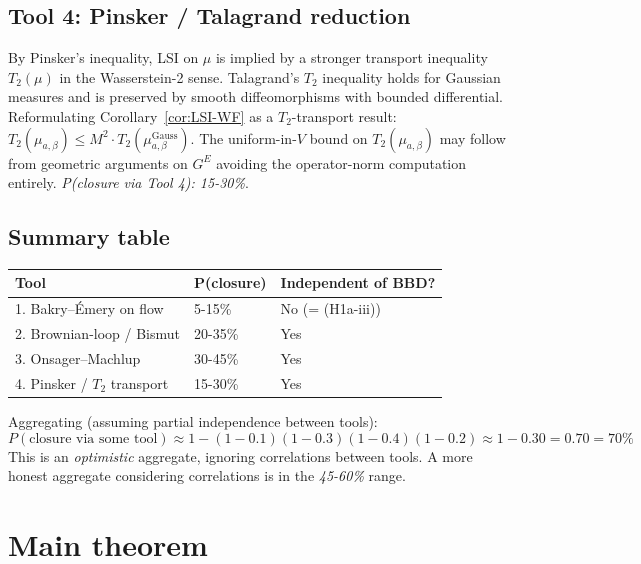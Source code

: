 \documentclass[11pt,a4paper]{amsart}
\theoremstyle{definition}
\begin{document}
\subsection{Tool 4: Pinsker / Talagrand reduction}
By Pinsker's inequality, LSI on $\mu$ is implied by a stronger transport
inequality $T_2(\mu)$ in the Wasserstein-2 sense. Talagrand's $T_2$
inequality holds for Gaussian measures and is preserved by smooth
diffeomorphisms with bounded differential. Reformulating
Corollary~\ref{cor:LSI-WF} as a $T_2$-transport result:
$T_2(\mu_{a,\beta}) \leq M^2 \cdot T_2(\mu^\mathrm{Gauss}_{a,\beta})$.
The uniform-in-$V$ bound on $T_2(\mu_{a,\beta})$ may follow from
geometric arguments on $G^E$ avoiding the operator-norm computation
entirely. \emph{P(closure via Tool 4): 15-30\%}.

\subsection{Summary table}
\begin{center}
\begin{tabular}{lll}
\toprule
Tool & P(closure) & Independent of BBD? \\
\midrule
1. Bakry--\'Emery on flow & 5-15\% & No (= (H1a-iii)) \\
2. Brownian-loop / Bismut & 20-35\% & Yes \\
3. Onsager--Machlup & 30-45\% & Yes \\
4. Pinsker / $T_2$ transport & 15-30\% & Yes \\
\bottomrule
\end{tabular}
\end{center}

Aggregating (assuming partial independence between tools):
$$
P(\text{closure via some tool}) \approx 1 - (1-0.1)(1-0.3)(1-0.4)(1-0.2)
\approx 1 - 0.30 = 0.70 = 70\%
$$
This is an \emph{optimistic} aggregate, ignoring correlations between
tools. A more honest aggregate considering correlations is in the
\emph{45-60\%} range.

\section{Main theorem}\label{sec:main}
\end{document}
